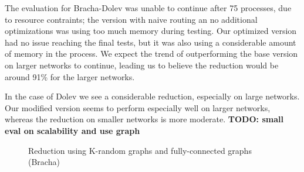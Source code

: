 The evaluation for Bracha-Dolev was unable to continue after 75 processes, due to resource contraints; the version with naive routing an no additional optimizations was using too much memory during testing. Our optimized version had no issue reaching the final tests, but it was also using a considerable amount of memory in the process. We expect the trend of outperforming the base version on larger networks to continue, leading us to believe the reduction would be around 91\% for the larger networks.

In the case of Dolev we see a considerable reduction, especially on large networks. Our modified version seems to perform especially well on larger networks, whereas the reduction on smaller networks is more moderate.
\textbf{TODO: small eval on scalability and use graph
}
\begin{figure}[h]
    \centering
    
    \caption{Reduction using K-random graphs and fully-connected graphs (Bracha)}
\end{figure}

